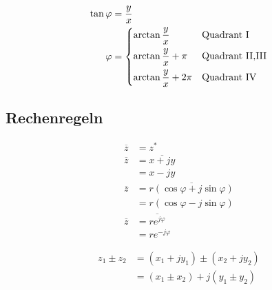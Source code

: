 \begin{boxleft}
\end{boxleft}\begin{boxrightshaded}
 \begin{align} 
\tan{\varphi}&=\frac{y}{x}\\
\varphi&=\begin{dcases*}
  \arctan{\frac{y}{x}}& Quadrant I\\
\arctan{\frac{y}{x}}+\pi& Quadrant II,III\\
\arctan{\frac{y}{x}}+2\pi& Quadrant IV
\end{dcases*}
\end{align}\end{boxrightshaded}

\subsection{Rechenregeln}

\begin{boxleft}
\end{boxleft}\begin{boxrightshaded}
 \begin{align} 
\overline{z}&=z^*\\
\overline{z}&=\overline{x+jy}\\
&=x-jy\\
\overline{z}&=\overline{r\left(\cos{\varphi}+j\sin{\varphi}\right)}\\
&=r\left(\cos{\varphi}-j\sin{\varphi}\right)\\
\overline{z}&=\overline{re^{j\varphi}}\\
&=re^{-j\varphi}
\end{align}\end{boxrightshaded}

\begin{boxleft}
\end{boxleft}\begin{boxrightshaded}
\begin{align} 
  z_1\pm z_2&=(x_1+jy_1)\pm(x_2+jy_2)\\
	    &=(x_1\pm x_2)+ j(y_1 \pm y_2)
\end{align}\end{boxrightshaded}

